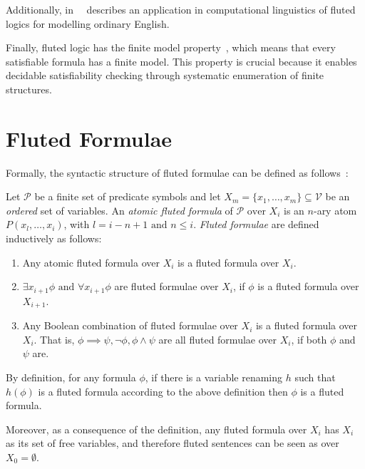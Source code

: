 Additionally, in~\cite{purdy1999quine}~\citeauthor{purdy1999quine} describes an application in computational linguistics of fluted logics for
modelling ordinary English.

Finally, fluted logic has the finite model property~\cite{purdy1996decidability,purdy1996fluted,purdy1999quine}, which means that every satisfiable formula has a finite model.
This property is crucial because it enables decidable satisfiability checking through systematic enumeration of finite structures.

\section{Fluted Formulae}

Formally, the syntactic structure of fluted formulae can be defined as follows~\cite{schmidt2000resolution}:

\begin{definition}\label{def:fluted-formulae}
  Let \(\mathcal{P}\) be a finite set of predicate symbols and let \(X_m = \{x_1, \ldots, x_m\} \subseteq \mathcal{V}\) be an \emph{ordered} set of variables.
  An \emph{atomic fluted formula} of \(\mathcal{P} \text{ over } X_i\) is an \(n\)-ary atom \(P(x_l,\ldots, x_i)\), with \(l = i - n + 1 \text{ and } n \leq i\).
  \emph{Fluted formulae} are defined inductively as follows:
  \begin{enumerate}
    \item Any atomic fluted formula over \(X_i\) is a fluted formula over \(X_i\).
    \item \(\exists x_{i+1}\phi \text{ and } \forall x_{i+1}\phi\) are fluted formulae over \(X_{i}\), if \(\phi\) is a fluted formula over \(X_{i+1}\).
    \item Any Boolean combination of fluted formulae over \(X_i\) is a fluted formula over \(X_i\). That is, \(\phi \implies \psi, \neg \phi, \phi \land \psi\) are all fluted formulae over \(X_i\), if both \(\phi\) and \(\psi\) are.
  \end{enumerate}
\end{definition}

By definition, for any formula \(\phi\), if there is a variable renaming \(h\) such that \(h(\phi)\) is a fluted formula according to the above definition then \(\phi\) is a fluted formula.

Moreover, as a consequence of the definition, any fluted formula over \(X_i\) has \(X_i\) as its set of free variables, and therefore fluted sentences can be seen as over \(X_0 = \emptyset\).

